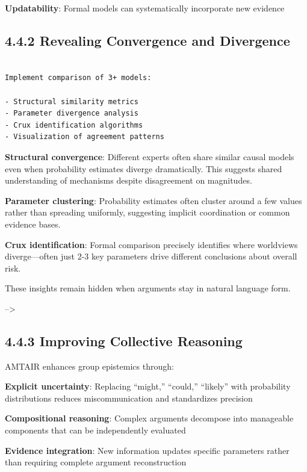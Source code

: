 \documentclass[
  11pt,
  letterpaper,
]{book}
\begin{document}
\textbf{Updatability}: Formal models can systematically incorporate new
evidence

\subsection*{4.4.2 Revealing Convergence and
Divergence}\label{sec-convergence-divergence}

\begin{verbatim}

Implement comparison of 3+ models:

- Structural similarity metrics
- Parameter divergence analysis
- Crux identification algorithms
- Visualization of agreement patterns
\end{verbatim}

\textbf{Structural convergence}: Different experts often share similar
causal models even when probability estimates diverge dramatically. This
suggests shared understanding of mechanisms despite disagreement on
magnitudes.

\textbf{Parameter clustering}: Probability estimates often cluster
around a few values rather than spreading uniformly, suggesting implicit
coordination or common evidence bases.

\textbf{Crux identification}: Formal comparison precisely identifies
where worldviews diverge---often just 2-3 key parameters drive different
conclusions about overall risk.

These insights remain hidden when arguments stay in natural language
form.

--\textgreater{}

\subsection*{4.4.3 Improving Collective
Reasoning}\label{sec-collective-reasoning}

AMTAIR enhances group epistemics through:

\textbf{Explicit uncertainty}: Replacing ``might,'' ``could,''
``likely'' with probability distributions reduces miscommunication and
standardizes precision

\textbf{Compositional reasoning}: Complex arguments decompose into
manageable components that can be independently evaluated

\textbf{Evidence integration}: New information updates specific
parameters rather than requiring complete argument reconstruction
\end{document}
